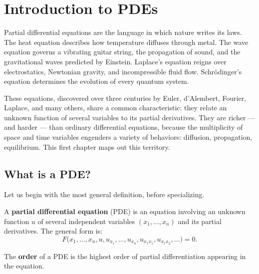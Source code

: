\chapter{Introduction to PDEs}
\label{ch:introduction}

Partial differential equations are the language in which nature writes its
laws. The heat equation describes how temperature diffuses through metal.
The wave equation governs a vibrating guitar string, the propagation of
sound, and the gravitational waves predicted by Einstein. Laplace's equation
reigns over electrostatics, Newtonian gravity, and incompressible fluid
flow. Schr\"odinger's equation determines the evolution of every quantum
system.

These equations, discovered over three centuries by Euler, d'Alembert,
Fourier, Laplace, and many others, share a common characteristic: they
relate an unknown function of several variables to its partial derivatives.
They are richer --- and harder --- than ordinary differential equations,
because the multiplicity of space and time variables engenders a variety of
behaviors: diffusion, propagation, equilibrium. This first chapter maps out
this territory.

\section{What is a PDE?}

Let us begin with the most general definition, before specializing.

\begin{definition}
A \textbf{partial differential equation} (PDE) is an equation involving an
unknown function $u$ of several independent variables
$(x_1, \ldots, x_n)$ and its partial derivatives. The general form is:
\[
    F\bigl(x_1, \ldots, x_n, u, u_{x_1}, \ldots, u_{x_n},
    u_{x_1 x_1}, u_{x_1 x_2}, \ldots\bigr) = 0.
\]
\end{definition}

\begin{definition}
The \textbf{order} of a PDE is the highest order of partial differentiation
appearing in the equation.
\end{definition}

